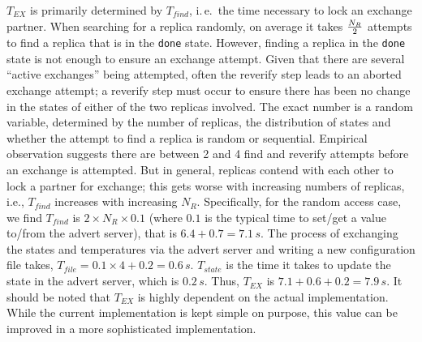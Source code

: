 \documentclass{rspublic}
\newcommand{\alnote}[1]{ {\textcolor{blue} { ***andre: #1 }}}
\newcommand{\athotanote}[1]{ {\textcolor{green} { ***athota: #1 }}}
\newcommand{\alnote}[1]{}
\newcommand{\athotanote}[1]{}
\begin{document}
$T_{EX}$ is primarily determined by $T_{find}$, i.\,e.\ the time necessary
to lock an exchange partner.  When searching for a replica randomly,
on average it takes $N_R \over 2$ attempts to find a replica that is
in the \texttt{done} state.  However, finding a replica in the
\texttt{done} state is not enough to ensure an exchange attempt.
Given that there are several ``active exchanges'' being attempted,
often the reverify step leads to an aborted exchange attempt; a
reverify step must occur to ensure there has been no change in the
states of either of the two replicas involved.  The exact number is a
random variable, determined by the number of replicas, the
distribution of states and whether the attempt to find a replica is
random or sequential. Empirical observation suggests there are between 2 and 4
find and reverify attempts before an exchange is attempted.  But in
general, replicas contend with each other to lock a partner for
exchange; this gets worse with increasing numbers of replicas, i.e.,
$T_{find}$ increases with increasing $N_R$.  Specifically, for the random
access case, we find $T_{find}$ is $2 \times N_R \times 0.1$ (where $0.1$
is the typical time to set/get a value to/from the advert server), that is $6.4+0.7=7.1\,s.$
The process of exchanging the
states and temperatures via the advert server and writing a new
configuration file takes, $T_{file} = 0.1\times 4 +0.2 = 0.6\,s$. %
$T_{state}$ is the time it takes to update the state in the advert
server, which is $0.2\,s$.  Thus, $T_{EX}$ is $7.1+0.6 +0.2=
7.9\,s$.  It should be noted that $T_{EX}$ is highly dependent on
the actual implementation. While the current implementation is kept
simple on purpose, this value can be improved in a more sophisticated 
implementation.

\end{document}
